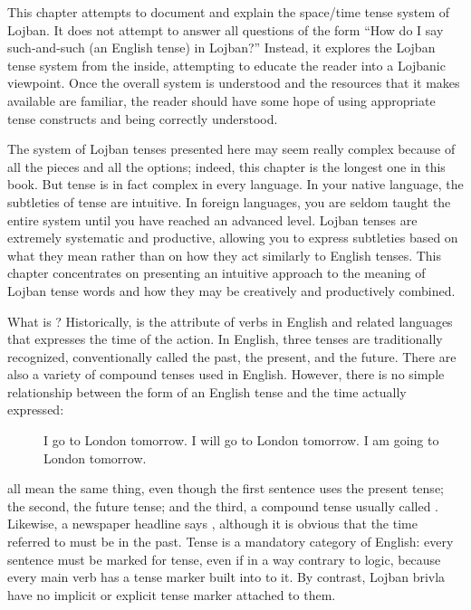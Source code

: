 This chapter attempts to document and explain the space/time
    tense system of Lojban. It does not attempt to answer all
    questions of the form ``How do I say such-and-such (an English
    tense) in Lojban?'' Instead, it explores the Lojban tense
    system from the inside, attempting to educate the reader into a
    Lojbanic viewpoint. Once the overall system is understood and
    the resources that it makes available are familiar, the reader
    should have some hope of using appropriate tense constructs and
    being correctly understood.

The system of Lojban tenses presented here may seem really
    complex because of all the pieces and all the options; indeed,
    this chapter is the longest one in this book. But tense is in
    fact complex in every language. In your native language, the
    subtleties of tense are intuitive. In foreign languages, you
    are seldom taught the entire system until you have reached an
    advanced level. Lojban tenses are extremely systematic and
    productive, allowing you to express subtleties based on what
    they mean rather than on how they act similarly to English
    tenses. This chapter concentrates on presenting an intuitive
    approach to the meaning of Lojban tense words and how they may
    be creatively and productively combined.

What is ? Historically,  is the attribute
    of verbs in English and related languages that expresses the
    time of the action. In English, three tenses are traditionally
    recognized, conventionally called the past, the present, and
    the future. There are also a variety of compound tenses used in
    English. However, there is no simple relationship between the
    form of an English tense and the time actually expressed:
\begin{description}
\item[] I go to London tomorrow. I will go to London tomorrow. I am going to London tomorrow.
\end{description}

all mean the same thing, even though the first sentence uses
    the present tense; the second, the future tense; and the third,
    a compound tense usually called .
    Likewise, a newspaper headline says , although it
    is obvious that the time referred to must be in the past. Tense
    is a mandatory category of English: every sentence must be
    marked for tense, even if in a way contrary to logic, because
    every main verb has a tense marker built into to it. By
    contrast, Lojban brivla have no implicit or explicit tense
    marker attached to them. 

